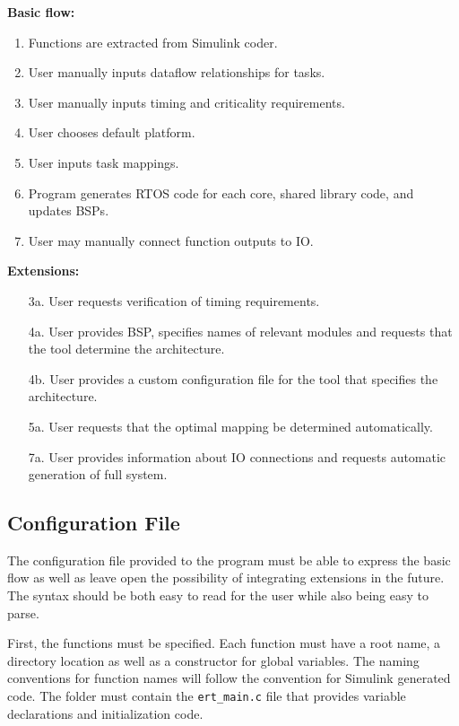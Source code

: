 \documentclass[table,11pt]{article}
\begin{document}
\textbf{Basic flow:}
\begin{enumerate}
  \item Functions are extracted from Simulink coder.
  \item User manually inputs dataflow relationships for tasks.
  \item User manually inputs timing and criticality requirements.
  \item User chooses default platform.
  \item User inputs task mappings.
  \item Program generates RTOS code for each core, shared library code, and updates BSPs.
  \item User may manually connect function outputs to IO.
\end{enumerate}

\textbf{Extensions:}
\begin{itemize}
  \item[3a.] User requests verification of timing requirements.  
  \item[4a.] User provides BSP, specifies names of relevant modules and requests that the tool determine the architecture.
  \item[4b.] User provides a custom configuration file for the tool that specifies the architecture.
  \item[5a.] User requests that the optimal mapping be determined automatically.
  \item[7a.] User provides information about IO connections and requests automatic generation of full system.
\end{itemize}

\subsection{Configuration File}

The configuration file provided to the program must be able to express the basic flow as well as leave open the possibility of integrating extensions in the future. The syntax should be both easy to read for the user while also being easy to parse.

First, the functions must be specified. Each function must have a root name, a directory location as well as a constructor for global variables. The naming conventions for function names will follow the convention for Simulink generated code. The folder must contain the \texttt{ert\_main.c} file that provides variable declarations and initialization code.
\end{document}
